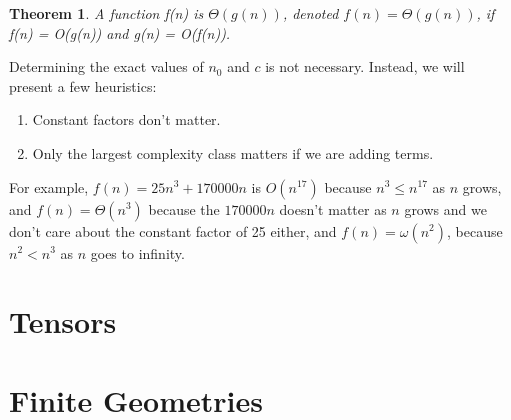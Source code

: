 \documentclass[12pt,twoside]{reedthesis}
\newtheorem{theorem}{Theorem}
\begin{document}
\begin{theorem}
A function f(n) is $\Theta(g(n))$, denoted $f(n) = \Theta(g(n))$, if f(n) = O(g(n)) and g(n) = O(f(n)).
\end{theorem}

Determining the exact values of $n_0$ and $c$ is not necessary. Instead, we will present a few heuristics:
\begin{enumerate}
\item Constant factors don't matter. 
\item Only the largest complexity class matters if we are adding terms.
\end{enumerate}
For example, $f(n)= 25n^3 + 170000n$ is $O(n^{17})$ because $n^3 \leq n^{17} $ as $n$ grows, and $f(n) = \Theta(n^3)$ because the $170000n$ doesn't matter as $n$ grows and we don't care about the constant factor of 25 either, and $f(n) = \omega(n^2)$, because $n^2 < n^3$ as $n$ goes to infinity.


      \chapter{Tensors}
      \chapter{Finite Geometries}



  \backmatter %

    \nocite{*}


%  
 

\end{document}
